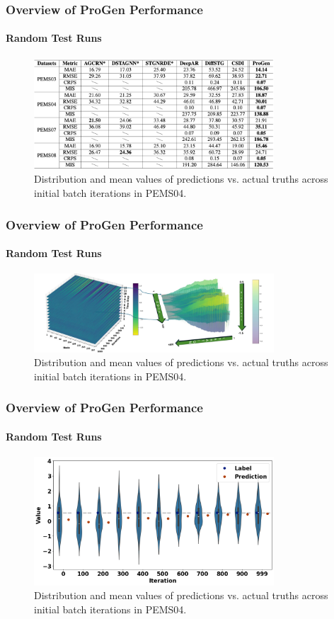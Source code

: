 \documentclass[light]{lutbeamer} %
\begin{document}
\begin{frame}
    \frametitle{Overview of ProGen Performance}
    \framesubtitle{Random Test Runs}

    \begin{figure}[ht]
        \centering
        \includegraphics[width=0.8\textwidth]{figures/random_runs_tab.png}
        \caption{Distribution and mean values of predictions vs. actual truths across initial batch iterations in PEMS04.}
    \end{figure}
\end{frame}


\begin{frame}
    \frametitle{Overview of ProGen Performance}
    \framesubtitle{Random Test Runs}

    \begin{figure}[ht]
        \centering
        \includegraphics[width=0.8\textwidth]{figures/pems04_3d_waves_plot.pdf}
        \caption{Distribution and mean values of predictions vs. actual truths across initial batch iterations in PEMS04.}
    \end{figure}
\end{frame}



\begin{frame}
    \frametitle{Overview of ProGen Performance}
    \framesubtitle{Random Test Runs}

    \begin{figure}[ht]
        \centering
        \includegraphics[width=0.8\textwidth]{figures/distribution_change_iteration_pems04.png        }
        \caption{Distribution and mean values of predictions vs. actual truths across initial batch iterations in PEMS04.}
    \end{figure}
\end{frame}
\end{document}
